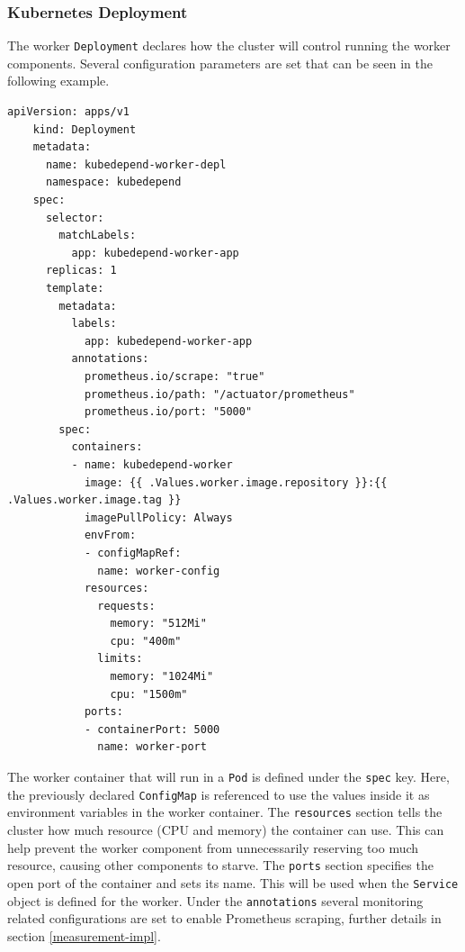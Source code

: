\subsubsection{Kubernetes Deployment}

The worker \texttt{Deployment} declares how the cluster will control running the worker components. Several configuration parameters are set that can be seen in the following example.

\begin{minipage}{\linewidth}
	\begin{lstlisting}[caption={Worker \texttt{Deployment}}]
	apiVersion: apps/v1
	kind: Deployment
	metadata:
	  name: kubedepend-worker-depl
	  namespace: kubedepend
	spec:
	  selector:
	    matchLabels:
	      app: kubedepend-worker-app
	  replicas: 1
	  template:
	    metadata:
	      labels:
	        app: kubedepend-worker-app
	      annotations:
	        prometheus.io/scrape: "true"
	        prometheus.io/path: "/actuator/prometheus"
	        prometheus.io/port: "5000"
	    spec:
	      containers:
	      - name: kubedepend-worker
	        image: {{ .Values.worker.image.repository }}:{{ .Values.worker.image.tag }}
	        imagePullPolicy: Always
	        envFrom:
	        - configMapRef:
	          name: worker-config
	        resources:
	          requests:
	            memory: "512Mi"
	            cpu: "400m"
	          limits:
	            memory: "1024Mi"
	            cpu: "1500m"
	        ports:
	        - containerPort: 5000
	          name: worker-port
	\end{lstlisting}
\end{minipage}

The worker container that will run in a \texttt{Pod} is defined under the \texttt{spec} key. Here, the previously declared \texttt{ConfigMap} is referenced to use the values inside it as environment variables in the worker container. The \texttt{resources} section tells the cluster how much resource (CPU and memory) the container can use. This can help prevent the worker component from unnecessarily reserving too much resource, causing other components to starve. The \texttt{ports} section specifies the open port of the container and sets its name. This will be used when the \texttt{Service} object is defined for the worker. Under the \texttt{annotations} several monitoring related configurations are set to enable Prometheus scraping, further details in section \ref{measurement-impl}.


